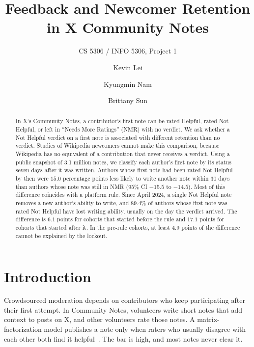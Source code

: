 \documentclass[sigconf,nonacm]{acmart}
\begin{document}
\title{Feedback and Newcomer Retention in X Community Notes}
\subtitle{CS 5306 / INFO 5306, Project 1}

\author{Kevin Lei}

\author{Kyungmin Nam}

\author{Brittany Sun}

\begin{abstract}
In X's Community Notes, a contributor's first note can be rated Helpful, rated Not Helpful,
or left in ``Needs More Ratings'' (NMR) with no verdict. We ask whether a Not Helpful
verdict on a first note is associated with different retention than no verdict. Studies of
Wikipedia newcomers cannot make this comparison, because Wikipedia has no equivalent of a
contribution that never receives a verdict. Using a public snapshot of 3.1 million notes,
we classify each author's first note by its status seven days after it was written.
Authors whose first note had been rated Not Helpful by then were $15.0$ percentage points
less likely to write another note within 30 days than authors whose note was still in NMR
($95\%$ CI $-15.5$ to $-14.5$). Most of this difference coincides with a platform rule.
Since April 2024, a single Not Helpful note removes a new author's ability to write, and
$89.4\%$ of authors whose first note was rated Not Helpful have lost writing ability,
usually on the day the verdict arrived. The difference is $6.1$ points for cohorts that
started before the rule and $17.1$ points for cohorts that started after it. In the
pre-rule cohorts, at least $4.9$ points of the difference cannot be explained by the
lockout.
\end{abstract}

\maketitle

\section{Introduction}

Crowdsourced moderation depends on contributors who keep participating after their first
attempt. In Community Notes, volunteers write short notes that add context to posts on X,
and other volunteers rate those notes. A matrix-factorization model publishes a note only
when raters who usually disagree with each other both find it
helpful~\cite{wojcik2022birdwatch}. The bar is high, and most notes never clear it.
\end{document}
